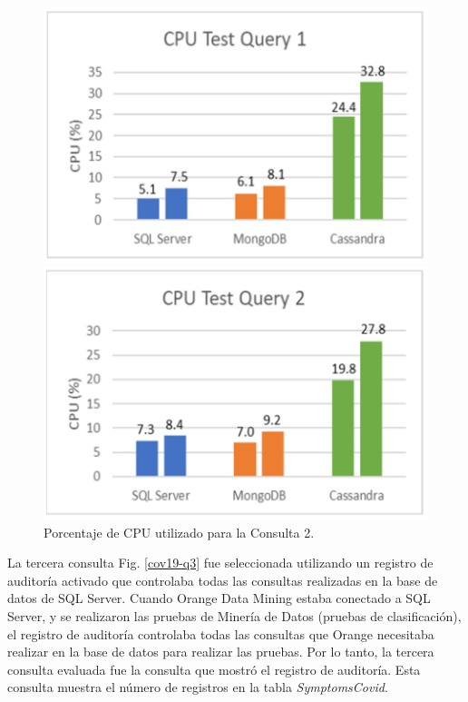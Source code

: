 \documentclass[pdflatex,sn-mathphys-num]{sn-jnl}
\theoremstyle{thmstyleone}%
\theoremstyle{thmstyletwo}%
\theoremstyle{thmstylethree}%
\begin{document}
\begin{figure}[H]
    \centering
    \begin{minipage}[b]{0.48\textwidth}
        \centering
        \includegraphics[width=\textwidth]{figs/cov19-cpu-test-q1.png}
        \caption{Porcentaje de CPU utilizado para la Consulta 1.}
        \label{cov19-cputest-q1}
    \end{minipage}
    \hfill
    \begin{minipage}[b]{0.48\textwidth}
        \centering
        \includegraphics[width=\textwidth]{figs/cov19-cpu-test-q2.png}
        \caption{Porcentaje de CPU utilizado para la Consulta 2.}
        \label{cov19-cputest-q2}
    \end{minipage}
\end{figure}

\vspace{-0.5cm}

La tercera consulta Fig. \ref{cov19-q3} fue seleccionada utilizando un registro de auditoría activado que controlaba todas las consultas realizadas en la base de datos de SQL Server. Cuando Orange Data Mining estaba conectado a SQL Server, y se realizaron las pruebas de Minería de Datos (pruebas de clasificación), el registro de auditoría controlaba todas las consultas que Orange necesitaba realizar en la base de datos para realizar las pruebas. Por lo tanto, la tercera consulta evaluada fue la consulta que mostró el registro de auditoría. Esta consulta muestra el número de registros en la tabla \textit{SymptomsCovid}.
\end{document}
